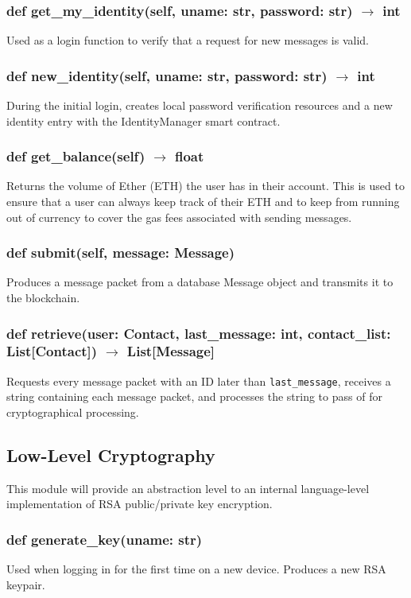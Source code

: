 \documentclass[titlepage]{report}
\begin{document}
\subsubsection{def get\_my\_identity(self, uname: str, password: str) $\rightarrow$ int}
Used as a login function to verify that a request for new messages is valid.
\subsubsection{def new\_identity(self, uname: str, password: str) $\rightarrow$ int}
During the initial login, creates local password verification resources and a new identity entry with the IdentityManager smart contract.
\subsubsection{def get\_balance(self) $\rightarrow$ float}
Returns the volume of \gls{Ether} (ETH) the user has in their account. This is used to ensure that a user can always keep track of their ETH and to keep from running out of currency to cover the gas fees associated with sending messages.
\subsubsection{def submit(self, message: Message)}
Produces a message packet from a database Message object and transmits it to the \gls{blockchain}.
\subsubsection{def retrieve(user: Contact, last\_message: int, contact\_list: List[Contact]) $\rightarrow$ List[Message]}
Requests every message packet with an ID later than \texttt{last\_message}, receives a string containing each message packet, and processes the string to pass of for cryptographical processing.

\subsection{Low-Level Cryptography}
This module will provide an abstraction level to an internal language-level implementation of RSA public/private key encryption.

\subsubsection{def generate\_key(uname: str)}
Used when logging in for the first time on a new device. Produces a new RSA keypair.
\end{document}
